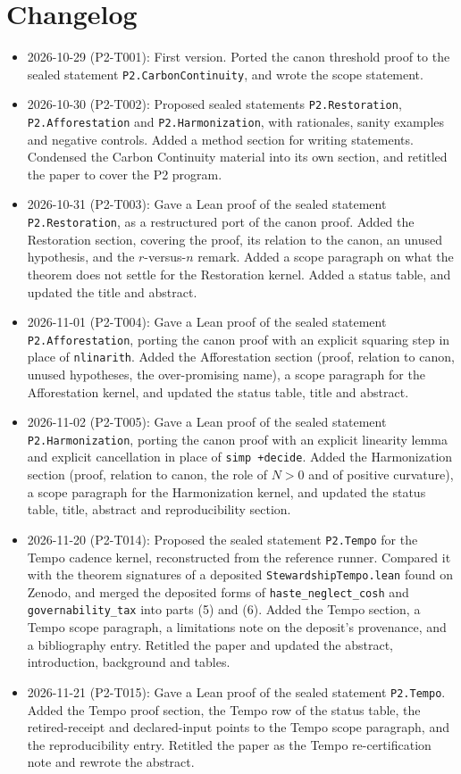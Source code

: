 \documentclass[11pt]{article}
\theoremstyle{definition}
\theoremstyle{remark}
\begin{document}
\section{Changelog}
\begin{itemize}
\item 2026-10-29 (P2-T001): First version. Ported the canon threshold proof to the sealed statement
\texttt{P2.CarbonContinuity}, and wrote the scope statement.
\item 2026-10-30 (P2-T002): Proposed sealed statements \texttt{P2.Restoration}, \texttt{P2.Afforestation} and \texttt{P2.Harmonization},
with rationales, sanity examples and negative controls. Added a method section for writing statements.
Condensed the Carbon Continuity material into its own section, and retitled the paper to cover the P2 program.
\item 2026-10-31 (P2-T003): Gave a Lean proof of the sealed statement \texttt{P2.Restoration}, as a restructured port of the canon
proof. Added the Restoration section, covering the proof, its relation to the canon, an unused hypothesis, and the $r$-versus-$n$ remark.
Added a scope paragraph on what the theorem does not settle for the Restoration kernel. Added a status table, and updated the title and abstract.
\item 2026-11-01 (P2-T004): Gave a Lean proof of the sealed statement \texttt{P2.Afforestation}, porting the canon proof with
an explicit squaring step in place of \texttt{nlinarith}. Added the Afforestation section (proof, relation to canon, unused hypotheses,
the over-promising name), a scope paragraph for the Afforestation kernel, and updated the status table, title and abstract.
\item 2026-11-02 (P2-T005): Gave a Lean proof of the sealed statement \texttt{P2.Harmonization}, porting the canon proof with an
explicit linearity lemma and explicit cancellation in place of \texttt{simp +decide}. Added the Harmonization section (proof,
relation to canon, the role of $N>0$ and of positive curvature), a scope paragraph for the Harmonization kernel, and updated the
status table, title, abstract and reproducibility section.
\item 2026-11-20 (P2-T014): Proposed the sealed statement \texttt{P2.Tempo} for the Tempo cadence kernel, reconstructed from the
reference runner. Compared it with the theorem signatures of a deposited \texttt{StewardshipTempo.lean} found on Zenodo, and
merged the deposited forms of \texttt{haste\_neglect\_cosh} and \texttt{governability\_tax} into parts (5) and (6).
Added the Tempo section, a Tempo scope paragraph, a limitations note on the deposit's provenance, and a bibliography entry.
Retitled the paper and updated the abstract, introduction, background and tables.
\item 2026-11-21 (P2-T015): Gave a Lean proof of the sealed statement \texttt{P2.Tempo}. Added the Tempo proof section, the Tempo
row of the status table, the retired-receipt and declared-input points to the Tempo scope paragraph, and the reproducibility entry.
Retitled the paper as the Tempo re-certification note and rewrote the abstract.
\end{itemize}



\end{document}
